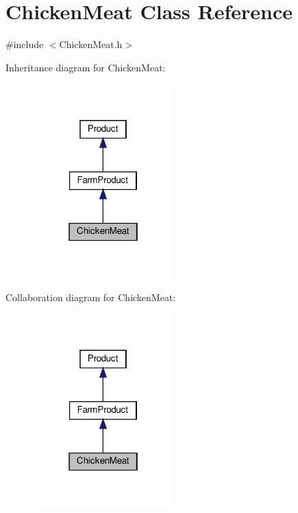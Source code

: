 \hypertarget{classChickenMeat}{}\section{Chicken\+Meat Class Reference}
\label{classChickenMeat}


{\ttfamily \#include $<$Chicken\+Meat.\+h$>$}



Inheritance diagram for Chicken\+Meat\+:
\nopagebreak
\begin{figure}[H]
\begin{center}
\leavevmode
\includegraphics[width=154pt]{classChickenMeat__inherit__graph}
\end{center}
\end{figure}


Collaboration diagram for Chicken\+Meat\+:
\nopagebreak
\begin{figure}[H]
\begin{center}
\leavevmode
\includegraphics[width=154pt]{classChickenMeat__coll__graph}
\end{center}
\end{figure}
